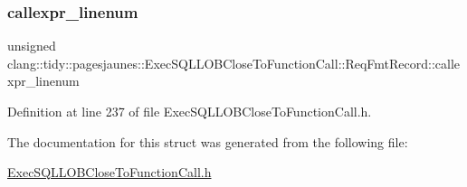 \subsubsection{\texorpdfstring{callexpr\+\_\+linenum}{callexpr\_linenum}}
{\footnotesize\ttfamily unsigned clang\+::tidy\+::pagesjaunes\+::\+Exec\+S\+Q\+L\+L\+O\+B\+Close\+To\+Function\+Call\+::\+Req\+Fmt\+Record\+::callexpr\+\_\+linenum}



Definition at line 237 of file Exec\+S\+Q\+L\+L\+O\+B\+Close\+To\+Function\+Call.\+h.



The documentation for this struct was generated from the following file\+:\begin{DoxyCompactItemize}
\item 
\hyperlink{_exec_s_q_l_l_o_b_close_to_function_call_8h}{Exec\+S\+Q\+L\+L\+O\+B\+Close\+To\+Function\+Call.\+h}\end{DoxyCompactItemize}
